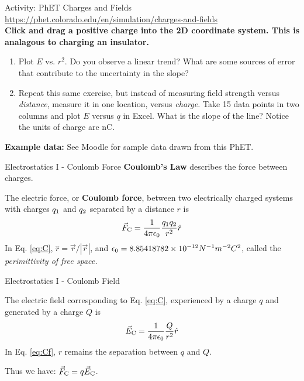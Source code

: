 \documentclass{beamer}
\begin{document}
\begin{frame}{Activity: PhET Charges and Fields}
\small
\url{https://phet.colorado.edu/en/simulation/charges-and-fields} \\ \vspace{0.2cm}
\textbf{Click and drag a positive charge into the 2D coordinate system.  This is analagous to charging an insulator.}
\begin{enumerate}
\item Plot $E$ vs. $r^2$.  Do you observe a linear trend?  What are some sources of error that contribute to the uncertainty in the slope?
\item Repeat this same exercise, but instead of measuring field strength versus \textit{distance}, measure it in one location, versus \textit{charge.} Take 15 data points in two columns and plot $E$ versus $q$ in Excel.  What is the slope of the line?  Notice the units of charge are nC.
\end{enumerate}
\textbf{Example data:} See Moodle for sample data drawn from this PhET.
\end{frame}

\begin{frame}{Electrostatics I - Coulomb Force}
\textbf{Coulomb's Law} describes the force between charges. \\ \vspace{0.5cm}
\begin{tcolorbox}[colback=white,colframe=gray,title=Coulomb's Law]
\alert{The electric force, or \textbf{Coulomb force}, between two electrically charged systems with charges $q_{\rm 1}$ and $q_{\rm 2}$ separated by a distance $r$ is
\begin{equation}
\vec{F}_{\rm C} = \frac{1}{4\pi\epsilon_{\rm 0}} \frac{q_{\rm 1} q_{\rm 2}}{r^2} \hat{r} \label{eq:C}
\end{equation}
In Eq. \ref{eq:C}, $\hat{r} = \vec{r}/|\vec{r}|$, and $\epsilon_{\rm 0} = 8.85418782\times 10^{-12} N^{-1} m^{-2} C^2$, called the \textit{perimittivity of free space.}}
\end{tcolorbox}
\end{frame}

\begin{frame}{Electrostatics I - Coulomb Field}
\begin{tcolorbox}[colback=white,colframe=gray,title=Coulomb Field]
\alert{The electric field corresponding to Eq. \ref{eq:C}, experienced by a charge $q$ and generated by a charge $Q$ is 
\begin{equation}
\vec{E}_{\rm C} = \frac{1}{4\pi\epsilon_{\rm 0}} \frac{Q}{r^2} \hat{r} \label{eq:Cf}
\end{equation}
In Eq. \ref{eq:Cf}, $r$ remains the separation between $q$ and $Q$.}
\end{tcolorbox}
Thus we have: $\vec{F}_{\rm C} = q \vec{E}_{\rm C}$.
\end{frame}
\end{document}
